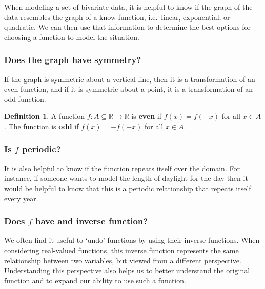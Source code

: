 \documentclass[
]{book}
\theoremstyle{definition}
\newtheorem{definition}{Definition}[chapter]
\theoremstyle{definition}
\theoremstyle{definition}
\theoremstyle{remark}
\begin{document}
When modeling a set of bivariate data, it is helpful to know if the graph of the data resembles the graph of a know function, i.e.~linear, exponential, or quadratic. We can then use that information to determine the best options for choosing a function to model the situation.

\hypertarget{does-the-graph-have-symmetry}{%
\subsubsection*{Does the graph have symmetry?}\label{does-the-graph-have-symmetry}}

If the graph is symmetric about a vertical line, then it is a transformation of an even function, and if it is symmetric about a point, it is a transformation of an odd function.

\begin{definition}
\protect\hypertarget{def:unnamed-chunk-209}{}{\label{def:unnamed-chunk-209} }A function \(f:A\subseteq \mathbb{R}\rightarrow \mathbb{R}\) is \textbf{even} if \(f(x)=f(-x)\) for all \(x\in A\). The function is \textbf{odd} if \(f(x)=-f(-x)\) for all \(x\in A\).
\end{definition}

\hypertarget{is-f-periodic}{%
\subsubsection*{\texorpdfstring{Is \(f\) periodic?}{Is f periodic?}}\label{is-f-periodic}}

It is also helpful to know if the function repeats itself over the domain. For instance, if someone wants to model the length of daylight for the day then it would be helpful to know that this is a periodic relationship that repeats itself every year.

\hypertarget{does-f-have-and-inverse-function}{%
\subsubsection*{\texorpdfstring{Does \(f\) have and inverse function?}{Does f have and inverse function?}}\label{does-f-have-and-inverse-function}}

We often find it useful to `undo' functions by using their inverse functions. When considering real-valued functions, this inverse function represents the same relationship between two variables, but viewed from a different perspective. Understanding this perspective also helps us to better understand the original function and to expand our ability to use such a function.
\end{document}
